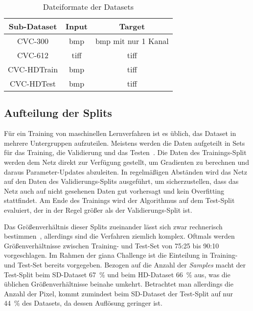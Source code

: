 \begin{table}
	\centering
	\caption{Dateiformate der Datasets}
	\label{tab:dataformats}
	\begin{tabular}{ccc} 
		\toprule
		Sub-Dataset & Input & Target \\ 
		\midrule
		CVC-300 & \gls{bmp} & \gls{bmp} mit nur 1 Kanal \\
		CVC-612 & \gls{tiff} & \gls{tiff} \\
		CVC-HDTrain & \gls{bmp} & \gls{tiff} \\
		CVC-HDTest & \gls{bmp} & \gls{tiff} \\
		\bottomrule
	\end{tabular}
\end{table}



\subsection{Aufteilung der Splits}

Für ein Training von maschinellen Lernverfahren ist es üblich, das Dataset in mehrere Untergruppen aufzuteilen.
Meistens werden die Daten aufgeteilt in Sets für das Training, die Validierung und das Testen~\cite{Guyon.1997}.
Die Daten des Trainings-Split werden dem Netz direkt zur Verfügung gestellt, um Gradienten zu berechnen und daraus Parameter-Updates abzuleiten.
In regelmäßigen Abständen wird das Netz auf den Daten des Validierungs-Splits ausgeführt, um sicherzustellen, dass das Netz auch auf nicht gesehenen Daten gut vorhersagt und kein Overfitting stattfindet.
Am Ende des Trainings wird der Algorithmus auf dem Test-Split evaluiert, der in der Regel größer als der Validierungs-Split ist.

Das Größenverhältnis dieser Splits zueinander lässt sich zwar rechnerisch bestimmen~\cite{Guyon.1998,Guyon.1997}, allerdings sind die Verfahren ziemlich komplex.
Oftmals werden Größenverhältnisse zwischen Training- und Test-Set von 75:25 bis 90:10 vorgeschlagen.
Im Rahmen der \gls{giana} Challenge ist die Einteilung in Training- und Test-Set bereits vorgegeben.
Bezogen auf die Anzahl der \emph{Samples} macht der Test-Split beim SD-Dataset 67~\% und beim HD-Dataset 66~\% aus, was die üblichen Größenverhältnisse beinahe umkehrt.
Betrachtet man allerdings die Anzahl der Pixel, kommt zumindest beim SD-Dataset der Test-Split auf nur 44~\% des Datasets, da dessen Auflösung geringer ist.

